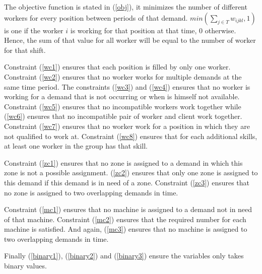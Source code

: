\documentclass[../../thesis.tex]{subfiles}
\begin{document}
The objective function is stated in (\ref{obj}), it minimizes the number of different workers for every position between periods of that demand. $min(\sum_{j \in T} w_{ijkl}, 1)$ is one if the worker $i$ is working for that position at that time, 0 otherwise. Hence, the sum of that value for all worker will be equal to the number of worker for that shift.


Constraint (\ref{wc1}) ensures that each position is filled by only one worker. Constraint (\ref{wc2}) ensures that no worker works for multiple demands at the same time period. The constraints (\ref{wc3}) and (\ref{wc4}) ensures that no worker is working for a demand that is not occurring or when is himself not available. Constraint (\ref{wc5}) ensures that no incompatible workers work together while (\ref{wc6}) ensures that no incompatible pair of worker and client work together. Constraint (\ref{wc7}) ensures that no worker work for a position in which they are not qualified to work at. 
Constraint (\ref{wc8}) ensures that for each additional skills, at least one worker in the group has that skill.

Constraint (\ref{zc1}) ensures that no zone is assigned to a demand in which this zone is not a possible assignment. (\ref{zc2}) ensures that only one zone is assigned to this demand if this demand is in need of a zone. Constraint (\ref{zc3}) ensures that no zone is assigned to two overlapping demands in time.

Constraint (\ref{mc1}) ensures that no machine is assigned to a demand not in need of that machine. Constraint (\ref{mc2}) ensures that the required number for each machine is satisfied. And again, (\ref{mc3}) ensures that no machine is assigned to two overlapping demands in time.


Finally (\ref{binary1}), (\ref{binary2}) and (\ref{binary3}) ensure the variables only takes binary values.
\end{document}
